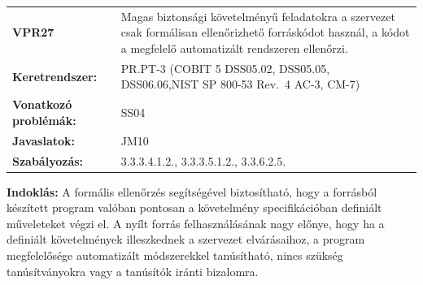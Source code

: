 \documentclass[12pt,magyar,a4paper,oneside]{scrreprt}
\begin{document}
\begin{longtable}[]{@{}ll@{}}
\toprule
\endhead
\begin{minipage}[t]{0.16\columnwidth}\raggedright
\textbf{VPR27}\strut
\end{minipage} & \begin{minipage}[t]{0.79\columnwidth}\raggedright
Magas biztonsági követelményű feladatokra a szervezet csak formálisan
ellenőrizhető forráskódot használ, a kódot a megfelelő automatizált
rendszeren ellenőrzi.\strut
\end{minipage}\tabularnewline
\begin{minipage}[t]{0.16\columnwidth}\raggedright
\textbf{Keretrendszer:}\strut
\end{minipage} & \begin{minipage}[t]{0.79\columnwidth}\raggedright
PR.PT-3 (COBIT 5 DSS05.02, DSS05.05, DSS06.06,NIST SP 800-53 Rev.~4
AC-3, CM-7)\strut
\end{minipage}\tabularnewline
\begin{minipage}[t]{0.16\columnwidth}\raggedright
\textbf{Vonatkozó problémák:}\strut
\end{minipage} & \begin{minipage}[t]{0.79\columnwidth}\raggedright
SS04\strut
\end{minipage}\tabularnewline
\begin{minipage}[t]{0.16\columnwidth}\raggedright
\textbf{Javaslatok:}\strut
\end{minipage} & \begin{minipage}[t]{0.79\columnwidth}\raggedright
JM10\strut
\end{minipage}\tabularnewline
\begin{minipage}[t]{0.16\columnwidth}\raggedright
\textbf{Szabályozás:}\strut
\end{minipage} & \begin{minipage}[t]{0.79\columnwidth}\raggedright
3.3.3.4.1.2., 3.3.3.5.1.2., 3.3.6.2.5.\strut
\end{minipage}\tabularnewline
\bottomrule
\end{longtable}

\textbf{Indoklás: } A formális ellenőrzés segítségével biztosítható,
hogy a forrásból készített program valóban pontosan a követelmény
specifikációban definiált műveleteket végzi el. A nyílt forrás
felhasználásának nagy előnye, hogy ha a definiált követelmények
illeszkednek a szervezet elvárásaihoz, a program megfelelősége
automatizált módszerekkel tanúsítható, nincs szükség tanúsítványokra
vagy a tanúsítók iránti bizalomra.
\end{document}
